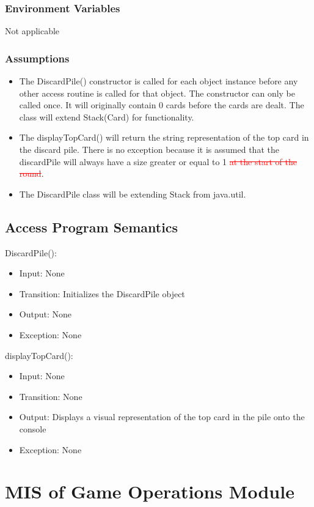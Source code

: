 \documentclass[12pt, titlepage]{article}
\begin{document}
\subsubsection{Environment Variables}
Not applicable

\subsubsection{Assumptions}
\begin{itemize}
    \item The DiscardPile() constructor is called for each object instance before any
      other access routine is called for that object.  The constructor can only be
      called once. It will originally contain 0 cards before the cards are dealt. The class will extend Stack(Card) for functionality.
    \item The displayTopCard() will return the string representation of the top card in the discard pile. There is no exception because it is assumed that the discardPile will always have a size greater or equal to 1 \textcolor{red}{\sout{at the start of the round}}.
    \item The DiscardPile class will be extending Stack from java.util.
\end{itemize}

\subsection{Access Program Semantics}
DiscardPile():
\begin{itemize}
    \item Input: None 
    \item Transition: Initializes the DiscardPile object
    \item Output: None
    \item Exception: None
\end{itemize}

\noindent displayTopCard():
\begin{itemize}
    \item Input: None 
    \item Transition: None
    \item Output: Displays a visual representation of the top card in the pile onto the console
    \item Exception: None
\end{itemize}

\section{MIS of Game Operations Module}
\end{document}
